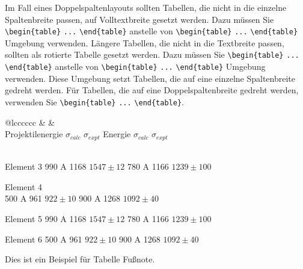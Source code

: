 \documentclass[pdflatex,sn-mathphys-num]{sn-jnl}%
\theoremstyle{thmstyleone}%
\theoremstyle{thmstyletwo}%
\theoremstyle{thmstylethree}%
\begin{document}
Im Fall eines Doppelspaltenlayouts sollten Tabellen, die nicht in die einzelne Spaltenbreite passen, auf Volltextbreite gesetzt werden. Dazu müssen Sie \verb+\begin{table}+ \verb+...+ \verb+\end{table}+ anstelle von \verb+\begin{table}+ \verb+...+ \verb+\end{table}+ Umgebung verwenden. Längere Tabellen, die nicht in die Textbreite passen, sollten als rotierte Tabelle gesetzt werden. Dazu müssen Sie \verb+\begin{table}+ \verb+...+ \verb+\end{table}+ anstelle von \verb+\begin{table}+ \verb+...+ \verb+\end{table}+ Umgebung verwenden. Diese Umgebung setzt Tabellen, die auf eine einzelne Spaltenbreite gedreht werden. Für Tabellen, die auf eine Doppelspaltenbreite gedreht werden, verwenden Sie \verb+\begin{table}+ \verb+...+ \verb+\end{table}+.

\begin{table}
\caption{Tabellen, die zu lang sind, um zu passen, sollten mit Hilfe der Umgebung geschrieben werden, wie hier gezeigt}\label{tab3}
\begin{tabular*}{\textheight}{@{\extracolsep\fill}lcccccc}
\toprule%
& &  \\%
Projektilenergie $\sigma_{calc}$ $\sigma_{expt}$ Energie $\sigma_{calc}$ $\sigma_{expt}$

\\{\midrule} Element 3 990 A 1168 $1547\pm12$ 780 A 1166 $1239\pm100$

Element 4 \\{500 A} 961 $922\pm10$ 900 A 1268 $1092\pm40$

Element 5 990 A 1168 $1547\pm12$ 780 A 1166 $1239\pm100$

Element 6 500 A 961 $922\pm10$ 900 A 1268 $1092\pm40$

\botrule
\end{tabular*}
 {\footnotetext[1]Dies ist ein Beispiel für Tabelle Fußnote}.
\end{table}
\end{document}
